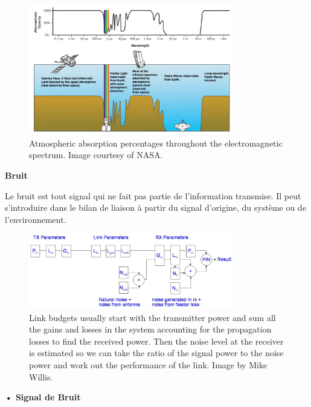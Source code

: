 \begin{figure}[H] %
    \centering
    \includegraphics[width=0.8\textwidth]{figures/6-58.jpg}
    
    \caption{Atmospheric absorption percentages throughout the electromagnetic spectrum. Image courtesy of NASA.}
    \label{fig:communication2}
\end{figure}

\textbf{Bruit}

Le bruit est tout signal qui ne fait pas partie de l'information transmise. Il peut s'introduire dans le bilan de liaison à partir du signal d'origine, du système ou de l'environnement.

\begin{figure}[H] %
    \centering
    \includegraphics[width=0.8\textwidth]{figures/6-59.jpg}
    
    \caption{Link budgets usually start with the transmitter power and sum all the gains and losses in the system accounting for the propagation losses to find the received power. Then the noise level at the receiver is estimated so we can take the ratio of the signal power to the noise power and work out the performance of the link. Image by Mike Willis.}
    \label{fig:communication2}
\end{figure}

\textbf{• Signal de Bruit}

